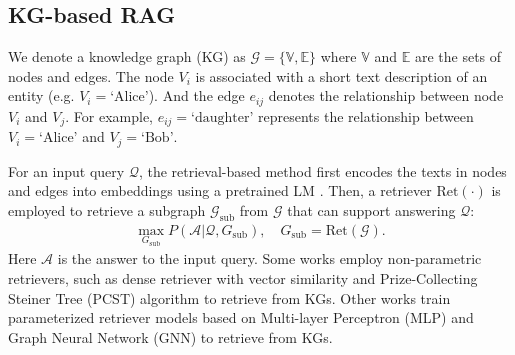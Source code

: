 
\subsection{KG-based RAG}
We denote a knowledge graph (KG) as $\mathcal{G}=\{\mathbb{V},\mathbb{E}\}$ where $\mathbb{V}$ and $\mathbb{E}$ are the sets of nodes and edges. %
The node $V_{i}$ is associated with a short text description of an entity (e.g. $V_{i}=\text{`Alice'}$).
And the edge $e_{ij}$ denotes the relationship between node $V_{i}$ and $V_{j}$. For example, $e_{ij}=\text{`daughter'}$ represents the relationship between $V_{i}=\text{`Alice'}$ and $V_{j}=\text{`Bob'}$.


For an input query $\mathcal{Q}$, the retrieval-based method \cite{he2024g, liretrieval, dong2024advanced,luo2025gfm,yasunaga2021qa,chen2024kg} first encodes the texts in nodes and edges into embeddings using a pretrained LM \cite{reimers2019sentence}. 
Then, a retriever $\mathrm{Ret}(\cdot)$ is employed to retrieve a subgraph $\mathcal{G}_{\text{sub}}$ from $\mathcal{G}$ \cite{yugraph} that can support answering $\mathcal{Q}$:
\begin{equation}
    \begin{aligned}        \max_{G_{\text{sub}}}P(\mathcal{A}|\mathcal{Q},G_{\text{sub}}), \quad G_{\text{sub}}=\mathrm{Ret}(\mathcal{G}).
    \end{aligned}
    \label{obj:maxize_1}
\end{equation}
Here $\mathcal{A}$ is the answer to the input query.
Some works employ non-parametric retrievers, such as dense retriever with vector similarity \cite{abaho2024select} and Prize-Collecting Steiner Tree (PCST) algorithm \cite{he2024g} to retrieve from KGs.
Other works train parameterized retriever models based on Multi-layer Perceptron (MLP) and Graph Neural Network (GNN) \cite{yu2022improving} to retrieve from KGs. 

